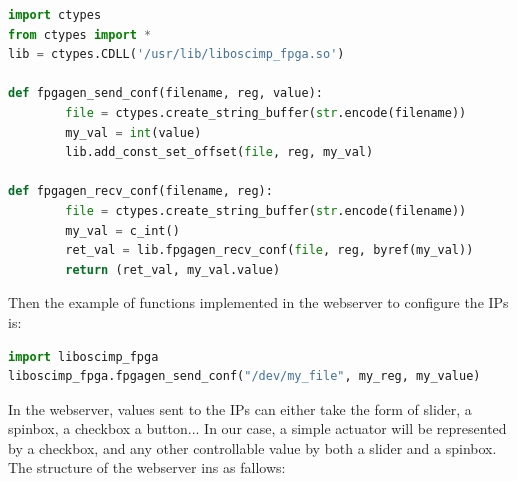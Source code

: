 \documentclass[12pt,oneside]{article}
\begin{document}
\vspace{-0.2cm}
\begin{lstlisting}[language=Python]
import ctypes
from ctypes import *
lib = ctypes.CDLL('/usr/lib/liboscimp_fpga.so')

def fpgagen_send_conf(filename, reg, value):
		file = ctypes.create_string_buffer(str.encode(filename))
		my_val = int(value)
		lib.add_const_set_offset(file, reg, my_val)

def fpgagen_recv_conf(filename, reg):
		file = ctypes.create_string_buffer(str.encode(filename))
		my_val = c_int()
		ret_val = lib.fpgagen_recv_conf(file, reg, byref(my_val))
		return (ret_val, my_val.value)
\end{lstlisting}

\hspace{1cm}

Then the example of functions implemented in the webserver to configure the IPs is:

\vspace{-0.2cm}
\begin{lstlisting}[language=Python]
import liboscimp_fpga
liboscimp_fpga.fpgagen_send_conf("/dev/my_file", my_reg, my_value)
\end{lstlisting}

\hspace{1cm}

In the webserver, values sent to the IPs can either take the form of slider, a spinbox, a checkbox a button... In our case, a simple actuator will be represented by a checkbox, and any other controllable value by both a slider and a spinbox. The structure of the webserver ins as fallows:
\end{document}
